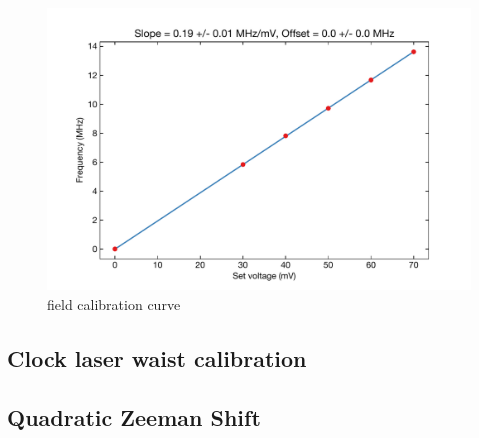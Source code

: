 \documentclass[bibnotes]{article}
\begin{document}
		\begin{figure}
		    \centering
		    \includegraphics[scale=0.8]{figures/field_calib_curve.pdf}
		    \caption{field calibration curve}
		    \label{fig:field_calib_curve}
		\end{figure}

\subsection{Clock laser waist calibration}
\subsection{Quadratic Zeeman Shift}
\end{document}
